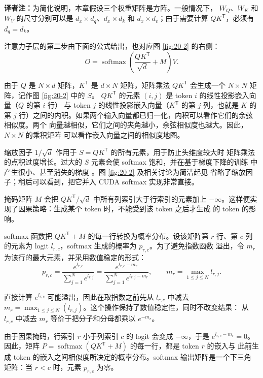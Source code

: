 \noindent\textbf{译者注：}为简化说明，本章假设三个权重矩阵是方阵。一般情况下，
$W_Q$、$W_K$ 和 $W_V$ 的尺寸分别可以是 $d_x\times d_q$、$d_x\times d_k$ 和
$d_x\times d_v$；由于需要计算 $QK^{\mathsf T}$，必须有 $d_q=d_k$。

注意力子层的第二步由下面的公式给出，也对应图 \ref{fig:20-2} 的右侧：
\begin{equation}
  O =
  \operatorname{softmax}\!\left(
    \frac{QK^{\mathsf T}}{\sqrt{d}} + M
  \right)V .
\label{eq:ch20-attention}
\end{equation}

由于 $Q$ 是 $N\times d$ 矩阵，$K^{\mathsf T}$ 是 $d\times N$ 矩阵，矩阵乘法
$QK^{\mathsf T}$ 会生成一个 $N\times N$ 矩阵，记作图 \ref{fig:20-2} 中的 $S$。
$QK^{\mathsf T}$ 的元素 $(i,j)$ 是 token $i$ 的线性投影嵌入向量（$Q$ 的第 $i$ 行）
与 token $j$ 的线性投影嵌入向量（$K^{\mathsf T}$ 的第 $j$ 列，也就是 $K$ 的第 $j$
行）之间的内积。如果两个输入向量都已归一化，内积可以看作它们的余弦相似度。两个
向量越相似，它们之间的夹角越小，余弦相似度也越大。因此，$N\times N$ 的乘积矩阵
可以看作嵌入向量之间的相似度地图。

缩放因子 $1/\sqrt d$ 作用于 $S=QK^{\mathsf T}$ 的所有元素，用于防止头维度较大时
矩阵乘法的点积过度增长。过大的 $S$ 元素会使 softmax 饱和，并在基于梯度下降的训练
中产生很小、甚至消失的梯度 \cite{ch20-1}。图 \ref{fig:20-2} 及相关讨论为简洁起见
省略了缩放因子；稍后可以看到，把它并入 CUDA softmax 实现非常直接。

掩码矩阵 $M$ 会把 $QK^{\mathsf T}/\sqrt d$ 中所有列索引大于行索引的元素加上
$-\infty$。这样便实现了因果策略：生成某个 token 时，不能受到该 token 之后才生成
的 token 的影响。

softmax 函数把 $QK^{\mathsf T}+M$ 的每一行转换为概率分布。设该矩阵第 $r$ 行、第
$c$ 列的元素为 logit $l_{r,c}$，softmax 生成的概率为 $p_{r,c}$。为了避免指数函数
溢出，令 $m_r$ 为该行的最大元素，并采用数值稳定的形式：
\begin{equation}
  p_{r,c}
  =
  \frac{e^{l_{r,c}}}{\sum_{j=1}^{N} e^{l_{r,j}}}
  =
  \frac{e^{l_{r,c}-m_r}}
       {\sum_{j=1}^{N}e^{l_{r,j}-m_r}},
  \qquad
  m_r=\max_{1\leq j\leq N} l_{r,j}.
\label{eq:ch20-softmax}
\end{equation}

直接计算 $e^{l_{r,c}}$ 可能溢出，因此在取指数之前先从 $l_{r,c}$ 中减去
$m_r=\max_{1\leq j\leq N}(l_{r,j})$。这个操作保持了数值稳定性，同时不改变结果：
从 $l_{r,c}$ 中减去 $m_r$ 等价于把分子和分母都乘以 $e^{-m_r}$。

由于因果掩码，行索引 $r$ 小于列索引 $c$ 的 logit 会变成 $-\infty$，于是
$e^{l_{r,c}-m_r}=0$。因此，矩阵
$P=\operatorname{softmax}(QK^{\mathsf T}+M)$ 的每一行，都是 token $r$ 的嵌入与
此前生成 token 的嵌入之间相似度所决定的概率分布。softmax 输出矩阵是一个下三角
矩阵：当 $r<c$ 时，元素 $p_{r,c}$ 为零。

